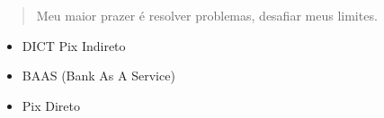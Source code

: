\documentclass[10pt,a4paper,ragged2e,withhyper]{altacv}
\begin{document}
\begin{paracol}{2}
        
        
        
        
        \switchcolumn
        
            \begin{quote}
                Meu maior prazer é resolver problemas, desafiar meus limites.
            \end{quote}
        
            \begin{itemize}
                \item DICT Pix Indireto
                \item BAAS (Bank As A Service)
                \item Pix Direto
            \end{itemize}
            
        

\end{paracol}
\end{document}
